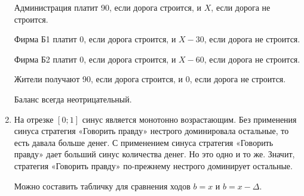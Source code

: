 \begin{enumerate}
Администрация платит 90, если дорога строится, и $ X $, если дорога не строится.

Фирма Б1 платит 0, если дорога строится, и $ X-30 $, если дорога не строится.

Фирма Б2 платит 0, если дорога строится, и $ X-60 $, если дорога не строится.

Жители получают 90, если дорога строится, и 0, если дорога не строится.

Баланс всегда неотрицательный.


\item На отрезке $ [0;1] $ синус является монотонно возрастающим. Без применения синуса стратегия «Говорить правду» нестрого доминировала остальные, то есть давала больше денег. С применением синуса стратегия «Говорить правду» дает больший синус количества денег. Но это одно и то же. Значит, стратегия «Говорить правду» по-прежнему нестрого доминирует остальные.

Можно составить табличку для сравнения ходов $ b=x $ и $ b=x-\Delta $.


\end{enumerate}
